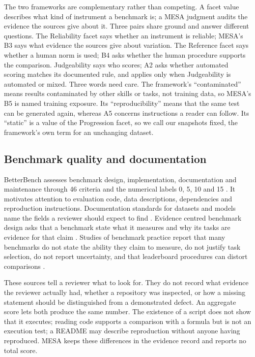 \documentclass[10pt,conference]{IEEEtran}
\begin{document}
The two frameworks are complementary rather than competing. A facet value describes what kind of instrument a benchmark is; a MESA judgment audits the evidence the sources give about it. Three pairs share ground and answer different questions. The Reliability facet says whether an instrument is reliable; MESA's B3 says what evidence the sources give about variation. The Reference facet says whether a human norm is used; B4 asks whether the human procedure supports the comparison. Judgeability says who scores; A2 asks whether automated scoring matches its documented rule, and applies only when Judgeability is automated or mixed. Three words need care. The framework's ``contaminated'' means results contaminated by other skills or tasks, not training data, so MESA's B5 is named training exposure. Its ``reproducibility'' means that the same test can be generated again, whereas A5 concerns instructions a reader can follow. Its ``static'' is a value of the Progression facet, so we call our snapshots fixed, the framework's own term for an unchanging dataset.

\subsection{Benchmark quality and documentation}
BetterBench assesses benchmark design, implementation, documentation and maintenance through 46 criteria and the numerical labels 0, 5, 10 and 15 \cite{reuel_betterbench}. It motivates attention to evaluation code, data descriptions, dependencies and reproduction instructions. Documentation standards for datasets and models name the fields a reviewer should expect to find \cite{gebru_datasheets_2021,mitchell_model_cards_2019}. Evidence centred benchmark design asks that a benchmark state what it measures and why its tasks are evidence for that claim \cite{liu_ecbd_2024}. Studies of benchmark practice report that many benchmarks do not state the ability they claim to measure, do not justify task selection, do not report uncertainty, and that leaderboard procedures can distort comparisons \cite{bean_measuring_what_matters,jo_wilson_what_does_your_benchmark_measure,cheng_benchmarking_broken,singh_leaderboard_illusion}.

These sources tell a reviewer what to look for. They do not record what evidence the reviewer actually had, whether a repository was inspected, or how a missing statement should be distinguished from a demonstrated defect. An aggregate score lets both produce the same number. The existence of a script does not show that it executes; reading code supports a comparison with a formula but is not an execution test; a README may describe reproduction without anyone having reproduced. MESA keeps these differences in the evidence record and reports no total score.
\end{document}
